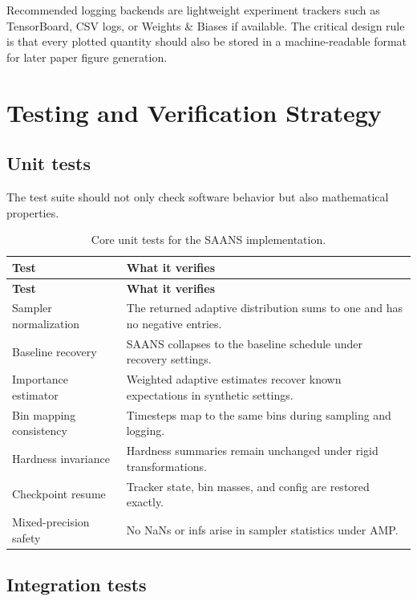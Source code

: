 \documentclass[11pt]{report}
\begin{document}
Recommended logging backends are lightweight experiment trackers such as TensorBoard, CSV logs, or Weights \& Biases if available. The critical design rule is that every plotted quantity should also be stored in a machine-readable format for later paper figure generation.

\chapter{Testing and Verification Strategy}

\section{Unit tests}

The test suite should not only check software behavior but also mathematical properties.

\begin{longtable}{p{}p{}}
\caption{Core unit tests for the SAANS implementation.}\label{tab:unit-tests} \\
\toprule
\textbf{Test} & \textbf{What it verifies} \\
\midrule
\endfirsthead
\toprule
\textbf{Test} & \textbf{What it verifies} \\
\midrule
\endhead
Sampler normalization & The returned adaptive distribution sums to one and has no negative entries. \\
Baseline recovery & SAANS collapses to the baseline schedule under recovery settings. \\
Importance estimator & Weighted adaptive estimates recover known expectations in synthetic settings. \\
Bin mapping consistency & Timesteps map to the same bins during sampling and logging. \\
Hardness invariance & Hardness summaries remain unchanged under rigid transformations. \\
Checkpoint resume & Tracker state, bin masses, and config are restored exactly. \\
Mixed-precision safety & No NaNs or infs arise in sampler statistics under AMP. \\
\bottomrule
\end{longtable}

\section{Integration tests}
\end{document}
